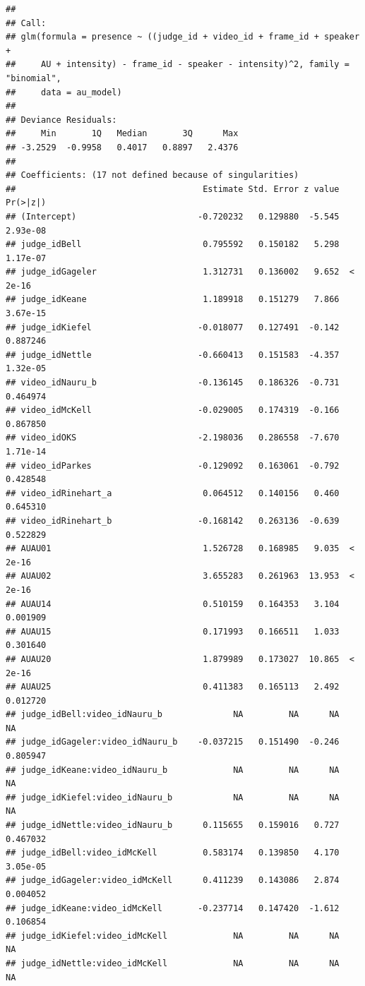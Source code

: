 \documentclass{monashthesis}
\begin{document}
\begin{verbatim}
## 
## Call:
## glm(formula = presence ~ ((judge_id + video_id + frame_id + speaker + 
##     AU + intensity) - frame_id - speaker - intensity)^2, family = "binomial", 
##     data = au_model)
## 
## Deviance Residuals: 
##     Min       1Q   Median       3Q      Max  
## -3.2529  -0.9958   0.4017   0.8897   2.4376  
## 
## Coefficients: (17 not defined because of singularities)
##                                     Estimate Std. Error z value Pr(>|z|)
## (Intercept)                        -0.720232   0.129880  -5.545 2.93e-08
## judge_idBell                        0.795592   0.150182   5.298 1.17e-07
## judge_idGageler                     1.312731   0.136002   9.652  < 2e-16
## judge_idKeane                       1.189918   0.151279   7.866 3.67e-15
## judge_idKiefel                     -0.018077   0.127491  -0.142 0.887246
## judge_idNettle                     -0.660413   0.151583  -4.357 1.32e-05
## video_idNauru_b                    -0.136145   0.186326  -0.731 0.464974
## video_idMcKell                     -0.029005   0.174319  -0.166 0.867850
## video_idOKS                        -2.198036   0.286558  -7.670 1.71e-14
## video_idParkes                     -0.129092   0.163061  -0.792 0.428548
## video_idRinehart_a                  0.064512   0.140156   0.460 0.645310
## video_idRinehart_b                 -0.168142   0.263136  -0.639 0.522829
## AUAU01                              1.526728   0.168985   9.035  < 2e-16
## AUAU02                              3.655283   0.261963  13.953  < 2e-16
## AUAU14                              0.510159   0.164353   3.104 0.001909
## AUAU15                              0.171993   0.166511   1.033 0.301640
## AUAU20                              1.879989   0.173027  10.865  < 2e-16
## AUAU25                              0.411383   0.165113   2.492 0.012720
## judge_idBell:video_idNauru_b              NA         NA      NA       NA
## judge_idGageler:video_idNauru_b    -0.037215   0.151490  -0.246 0.805947
## judge_idKeane:video_idNauru_b             NA         NA      NA       NA
## judge_idKiefel:video_idNauru_b            NA         NA      NA       NA
## judge_idNettle:video_idNauru_b      0.115655   0.159016   0.727 0.467032
## judge_idBell:video_idMcKell         0.583174   0.139850   4.170 3.05e-05
## judge_idGageler:video_idMcKell      0.411239   0.143086   2.874 0.004052
## judge_idKeane:video_idMcKell       -0.237714   0.147420  -1.612 0.106854
## judge_idKiefel:video_idMcKell             NA         NA      NA       NA
## judge_idNettle:video_idMcKell             NA         NA      NA       NA

\end{verbatim}
\end{document}
